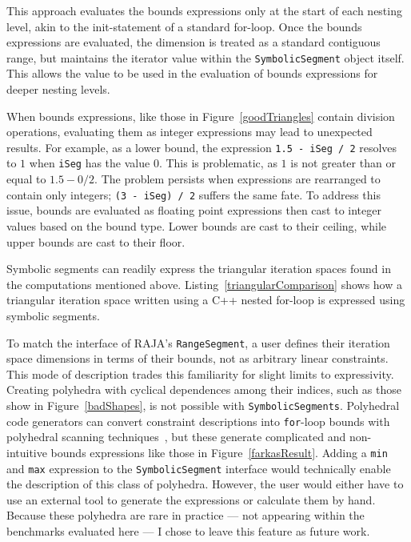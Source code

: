 This approach evaluates the bounds expressions only at the start of each nesting level, akin to the init-statement of a standard for-loop.
Once the bounds expressions are evaluated, the dimension is treated as a standard contiguous range, but maintains the iterator value within the \verb.SymbolicSegment. object itself.
This allows the value to be used in the evaluation of bounds expressions for deeper nesting levels.

When bounds expressions, like those in Figure~\ref{goodTriangles} contain division operations, evaluating them as integer expressions may lead to unexpected results. 
For example, as a lower bound, the expression \verb_1.5 - iSeg / 2_ resolves to $1$ when \verb.iSeg. has the value $0$. 
This is problematic, as $1$ is not greater than or equal to $1.5 - 0/2$.
The problem persists when expressions are rearranged to contain only integers; \verb.(3 - iSeg) / 2. suffers the same fate.
To address this issue, bounds are evaluated as floating point expressions then cast to integer values based on the bound type.
Lower bounds are cast to their ceiling, while upper bounds are cast to their floor.

Symbolic segments can readily express the triangular iteration spaces found in the computations mentioned above. 
Listing~\ref{triangularComparison} shows how a triangular iteration space written using a C++ nested for-loop is expressed using symbolic segments.

To match the interface of RAJA's \verb.RangeSegment., a user defines their iteration space dimensions in terms of their bounds, not as arbitrary linear constraints.
This mode of description trades this familiarity for slight limits to expressivity.
Creating polyhedra with cyclical dependences among their indices, such as those show in Figure~\ref{badShapes}, is not possible with \verb.SymbolicSegments.. 
Polyhedral code generators can convert constraint descriptions into \verb.for.-loop bounds with polyhedral scanning techniques~\cite{pouchet2007iterative,grosser2011polly, benabderrahmane2010polyhedral}, but these generate complicated and non-intuitive bounds expressions like those in Figure~\ref{farkasResult}. 
Adding a \verb.min. and \verb.max. expression to the \verb.SymbolicSegment. interface would technically enable the description of this class of polyhedra.
However, the user would either have to use an external tool to generate the expressions or calculate them by hand.
Because these polyhedra are rare in practice --- not appearing within the benchmarks evaluated here --- I chose to leave this feature as future work.



